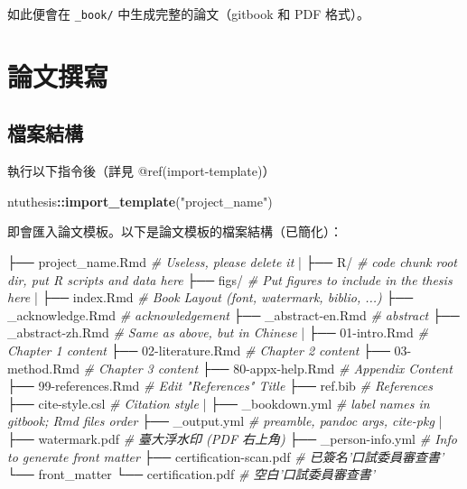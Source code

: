 \documentclass[oneside]{book}
\newenvironment{Shaded}{\begin{snugshade}}{\end{snugshade}}
\newcommand{\CommentTok}[1]{\textcolor[rgb]{0.56,0.35,0.01}{\textit{#1}}}
\newcommand{\KeywordTok}[1]{\textcolor[rgb]{0.13,0.29,0.53}{\textbf{#1}}}
\newcommand{\NormalTok}[1]{#1}
\newcommand{\OperatorTok}[1]{\textcolor[rgb]{0.81,0.36,0.00}{\textbf{#1}}}
\newcommand{\StringTok}[1]{\textcolor[rgb]{0.31,0.60,0.02}{#1}}
\begin{document}
如此便會在 \texttt{\_book/} 中生成完整的論文（gitbook 和 PDF 格式）。

\hypertarget{write-thesis}{%
\chapter{論文撰寫}\label{write-thesis}}

\hypertarget{dir-structure}{%
\section{檔案結構}\label{dir-structure}}

執行以下指令後（詳見 @ref(import-template)）

\begin{Shaded}
\begin{Highlighting}[]
\NormalTok{ntuthesis}\OperatorTok{::}\KeywordTok{import_template}\NormalTok{(}\StringTok{"project_name"}\NormalTok{)}
\end{Highlighting}
\end{Shaded}

即會匯入論文模板。以下是論文模板的檔案結構（已簡化）：

\begin{Shaded}
\begin{Highlighting}[]
\NormalTok{├── project_name.Rmd     }\CommentTok{# Useless, please delete it}
\NormalTok{|}
\NormalTok{├── R/                   }\CommentTok{# code chunk root dir, put R scripts and data here}
\NormalTok{├── figs/                }\CommentTok{# Put figures to include in the thesis here}
\NormalTok{|}
\NormalTok{├── index.Rmd            }\CommentTok{# Book Layout (font, watermark, biblio, ...)}
\NormalTok{├── _acknowledge.Rmd     }\CommentTok{# acknowledgement}
\NormalTok{├── _abstract-en.Rmd     }\CommentTok{# abstract}
\NormalTok{├── _abstract-zh.Rmd     }\CommentTok{# Same as above, but in Chinese}
\NormalTok{|}
\NormalTok{├── 01-intro.Rmd         }\CommentTok{# Chapter 1 content}
\NormalTok{├── 02-literature.Rmd    }\CommentTok{# Chapter 2 content}
\NormalTok{├── 03-method.Rmd        }\CommentTok{# Chapter 3 content}
\NormalTok{├── 80-appx-help.Rmd     }\CommentTok{# Appendix Content}
\NormalTok{├── 99-references.Rmd    }\CommentTok{# Edit "References" Title}
\NormalTok{├── ref.bib              }\CommentTok{# References}
\NormalTok{├── cite-style.csl       }\CommentTok{# Citation style}
\NormalTok{|}
\NormalTok{├── _bookdown.yml        }\CommentTok{# label names in gitbook; Rmd files order}
\NormalTok{├── _output.yml          }\CommentTok{# preamble, pandoc args, cite-pkg}
\NormalTok{|}
\NormalTok{├── watermark.pdf        }\CommentTok{# 臺大浮水印 (PDF 右上角)}
\NormalTok{├── _person-info.yml      }\CommentTok{# Info to generate front matter}
\NormalTok{├── certification-scan.pdf  }\CommentTok{# 已簽名'口試委員審查書'}
\NormalTok{└── front_matter}
\NormalTok{    └── certification.pdf   }\CommentTok{# 空白'口試委員審查書'}
\end{Highlighting}
\end{Shaded}
\end{document}
